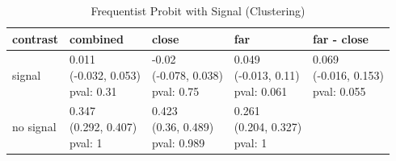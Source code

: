 \documentclass[
]{article}
\begin{document}
\begin{table}

\caption{\label{tab:signal-estimates}Frequentist Probit with Signal (Clustering)}
\centering
\begin{tabular}[t]{l|l|l|l|l}
\hline
contrast & combined & close & far & far - close\\
\hline
signal & \makecell[c]{0.011\\(-0.032, 0.053)\\pval: 0.31} & \makecell[c]{-0.02\\(-0.078, 0.038)\\pval: 0.75} & \makecell[c]{0.049\\(-0.013, 0.11)\\pval: 0.061} & \makecell[c]{0.069\\(-0.016, 0.153)\\pval: 0.055}\\
\hline
no signal & \makecell[c]{0.347\\(0.292, 0.407)\\pval: 1} & \makecell[c]{0.423\\(0.36, 0.489)\\pval: 0.989} & \makecell[c]{0.261\\(0.204, 0.327)\\pval: 1} & \\
\hline
\end{tabular}
\end{table}
\end{document}
